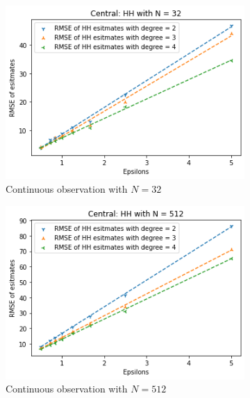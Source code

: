 \documentclass[11pt]{article}
\theoremstyle{definition}
\begin{document}
\begin{figure}[H]
     \centering
     \begin{subfigure}[b]{0.3\textwidth}
         \centering
         \includegraphics[width=\textwidth]{figures/hh_cen_epsi/hh_N_lin=32.png}
         \caption{Continuous observation with $N=32$}
         \label{fig:a3}
     \end{subfigure}
     \hfill
     \begin{subfigure}[b]{0.3\textwidth}
         \centering
         \includegraphics[width=\textwidth]{figures/hh_cen_epsi/hh_N_lin=512.png}
         \caption{Continuous observation with $N=512$}
         \label{fig:b3}
     \end{subfigure}
     \hfill
     \begin{subfigure}[b]{0.3\textwidth}

\end{subfigure}
\end{figure}
\end{document}
